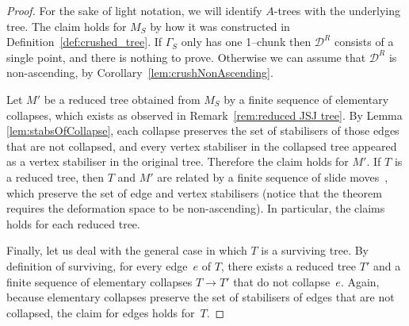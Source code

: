 \documentclass[svgnames]{amsart}
\theoremstyle{plain}
\theoremstyle{definition}
\newcommand{\crush}[2]{\mathcal{#1}^{#2}}
\begin{document}
\begin{proof} 
    For the sake of light notation, we will identify $A$-trees with the underlying tree. The claim holds for $M_S$ by how it was constructed in Definition~\ref{def:crushed_tree}. If $\Gamma_S$ only has one 1--chunk then $\crush{D}{R}$ consists of a single point, and there is nothing to prove. Otherwise we can assume that $\crush{D}{R}$ is non-ascending, by Corollary~\ref{lem:crushNonAscending}.
    
    Let ${M}'$ be a reduced tree obtained  from $M_S$ by a finite sequence of elementary collapses, which exists as observed in Remark~\ref{rem:reduced JSJ tree}. By Lemma \ref{lem:stabsOfCollapse}, each collapse preserves the set of stabilisers of those edges that are not collapsed, and every vertex stabiliser in the collapsed tree appeared as a vertex stabiliser in the original tree. Therefore the claim holds for ${M}'$. If $T$ is a reduced tree, then $T$ and ${M}'$ are related by a finite sequence of slide moves~\cite[Theorem 7.2]{GL_def_trees}, which preserve the set of edge and vertex stabilisers (notice that the theorem requires the deformation space to be non-ascending). In particular, the claims holds for each reduced tree.\medskip
    
    Finally, let us deal with the general case in which $T$ is a surviving tree. By definition of surviving, for every edge~$e$ of $T$, there exists a reduced tree $T'$ and a finite sequence of elementary collapses $T\to T'$ that do not collapse~$e$. Again, because elementary collapses preserve the set of stabilisers of edges that are not collapsed, the claim for edges holds for~$T$. \par


\end{proof}
\end{document}
